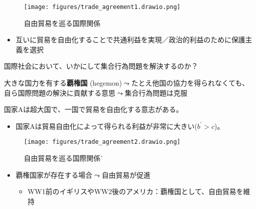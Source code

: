 \documentclass[
  xelatex,
  ja=standard]{bxjsarticle}
\providecommand{\tightlist}{%
  \setlength{\itemsep}{0pt}\setlength{\parskip}{0pt}}\usepackage{longtable,booktabs,array}
\begin{document}
\begin{figure}[htpb]

{\centering \texttt{[image: figures/trade\_agreement1.drawio.png]}

}

\caption{自由貿易を巡る国際関係}

\end{figure}

\begin{itemize}
\tightlist
\item
  互いに貿易を自由化することで共通利益を実現／政治的利益のために保護主義を選択
\end{itemize}

国際社会において、いかにして集合行為問題を解決するのか？

大きな国力を有する\textbf{覇権国}
(hegemon)\(\leadsto\)たとえ他国の協力を得られなくても、自ら国際問題の解決に貢献する意思\(\leadsto\)集合行為問題は克服\citep{lake1993}

\begin{tcolorbox}[enhanced jigsaw, left=2mm, colframe=quarto-callout-tip-color-frame, colback=white, coltitle=black, rightrule=.15mm, title=\textcolor{quarto-callout-tip-color}{\faLightbulb}\hspace{0.5em}{自由貿易を巡る国際関係'}, arc=.35mm, toprule=.15mm, bottomrule=.15mm, leftrule=.75mm, bottomtitle=1mm, toptitle=1mm, titlerule=0mm, breakable, opacitybacktitle=0.6, colbacktitle=quarto-callout-tip-color!10!white, opacityback=0]

国家Aは超大国で、一国で貿易を自由化する意志がある。

\begin{itemize}
\tightlist
\item
  国家Aは貿易自由化によって得られる利益が非常に大きい(\(b^\prime > c\))。
\end{itemize}

\end{tcolorbox}

\begin{figure}[htpb]

{\centering \texttt{[image: figures/trade\_agreement2.drawio.png]}

}

\caption{自由貿易を巡る国際関係'}

\end{figure}

\begin{itemize}
\tightlist
\item
  覇権国家が存在する場合\(\leadsto\)自由貿易が促進

  \begin{itemize}
  \tightlist
  \item
    WW1前のイギリスやWW2後のアメリカ：覇権国として、自由貿易を維持
  \end{itemize}
\end{itemize}
\end{document}
